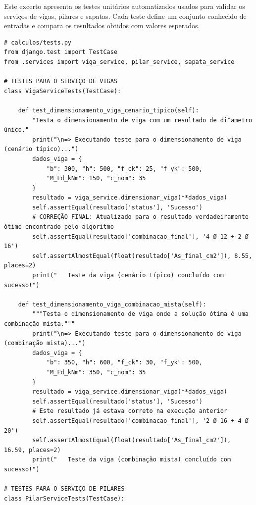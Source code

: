 Este excerto apresenta os testes unitários automatizados usados para validar os serviços de vigas, pilares e sapatas. Cada teste define um conjunto conhecido de entradas e compara os resultados obtidos com valores esperados.

\newpage
\begin{lstlisting}[style=PythonStyle, basicstyle=\ttfamily\normalsize, caption={Testes Unitários Automatizados (calculos/tests.py)}, label={lst:tests_py}]
# calculos/tests.py
from django.test import TestCase
from .services import viga_service, pilar_service, sapata_service

# TESTES PARA O SERVIÇO DE VIGAS
class VigaServiceTests(TestCase):
    
    def test_dimensionamento_viga_cenario_tipico(self):
        "Testa o dimensionamento de viga com um resultado de di^ametro único."
        print("\n=> Executando teste para o dimensionamento de viga (cenário típico)...")
        dados_viga = {
            "b": 300, "h": 500, "f_ck": 25, "f_yk": 500,
            "M_Ed_kNm": 150, "c_nom": 35
        }
        resultado = viga_service.dimensionar_viga(**dados_viga)
        self.assertEqual(resultado['status'], 'Sucesso')
        # CORREÇÃO FINAL: Atualizado para o resultado verdadeiramente ótimo encontrado pelo algoritmo
        self.assertEqual(resultado['combinacao_final'], '4 Ø 12 + 2 Ø 16')
        self.assertAlmostEqual(float(resultado['As_final_cm2']), 8.55, places=2)
        print("   Teste da viga (cenário típico) concluído com sucesso!")

    def test_dimensionamento_viga_combinacao_mista(self):
        """Testa o dimensionamento de viga onde a solução ótima é uma combinação mista."""
        print("\n=> Executando teste para o dimensionamento de viga (combinação mista)...")
        dados_viga = {
            "b": 350, "h": 600, "f_ck": 30, "f_yk": 500,
            "M_Ed_kNm": 350, "c_nom": 35
        }
        resultado = viga_service.dimensionar_viga(**dados_viga)
        self.assertEqual(resultado['status'], 'Sucesso')
        # Este resultado já estava correto na execução anterior
        self.assertEqual(resultado['combinacao_final'], '2 Ø 16 + 4 Ø 20')
        self.assertAlmostEqual(float(resultado['As_final_cm2']), 16.59, places=2)
        print("   Teste da viga (combinação mista) concluído com sucesso!")

# TESTES PARA O SERVIÇO DE PILARES
class PilarServiceTests(TestCase):


\end{lstlisting}
